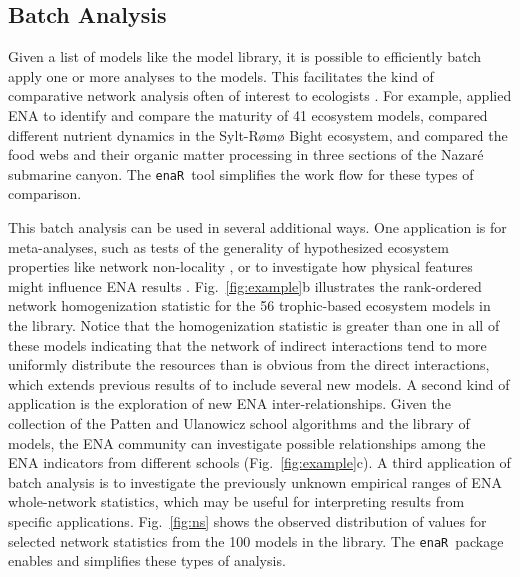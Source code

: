 \documentclass[11pt]{article}
\newcommand{\enaR}{\texttt{enaR}}
\begin{document}
\begin{spacing}{2}
\subsection{Batch Analysis}
Given a list of models like the model library, it is possible to
efficiently batch apply one or more analyses to the models.  This
facilitates the kind of comparative network analysis often of
interest to ecologists \citep{monaco97,christian05_cnea}. For
example, \citet{christensen95} applied ENA to identify and compare the
maturity of 41 ecosystem models,
\citet{baird08_sylt} compared different nutrient dynamics in the
Sylt-R{\o}m{\o} Bight ecosystem, and \citet{vanoevelen2011canyon}
compared the food webs and their organic matter processing in three
sections of the Nazar{\'e} submarine canyon.  The \enaR\ tool
simplifies the work flow for these types of comparison.

This batch analysis can be used in several additional ways.  One
application is for meta-analyses, such as tests of the generality of
hypothesized ecosystem properties like network non-locality
\citep{salas11_did}, %
or to investigate how physical features might influence ENA results
\citep{niquil2012physical}. Fig.~\ref{fig:example}b illustrates the
rank-ordered network homogenization statistic for the 56 trophic-based
ecosystem models in the library. Notice that the homogenization
statistic is greater than one in all of these models indicating that
the network of indirect interactions tend to more uniformly distribute
the resources than is obvious from the direct interactions, which
extends previous results of \citet{borrett10_hmg} to include several
new models.  A second kind of application is the exploration of new
ENA inter-relationships.  Given the collection of the Patten and
Ulanowicz school algorithms and the library of models, the ENA
community can investigate possible relationships among the ENA
indicators from different schools (Fig.~\ref{fig:example}c).  A third
application of batch analysis is to investigate the previously unknown
empirical ranges of ENA whole-network statistics, which may be useful
for interpreting results from specific applications.
Fig.~\ref{fig:ns} shows the observed distribution of values for
selected network statistics from the 100 models in the library. The
\enaR\ package enables and simplifies these types of analysis.


\end{spacing}
\end{document}
